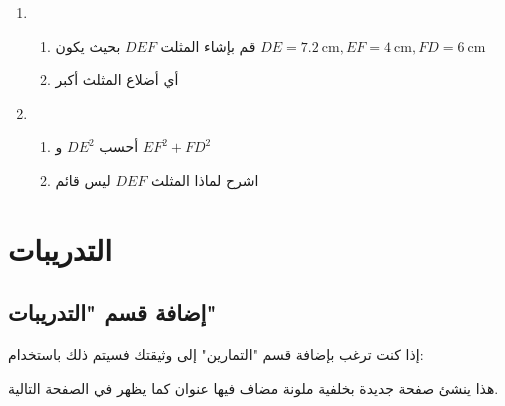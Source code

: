 \documentclass[12pt,a4paper]{mathbook_arabic}
\begin{document}


\begin{enumerate}
\item
\begin{enumerate}
\item  قم بإشاء المثلت $DEF$ بحيث يكون
$DE=7.2\ \text{cm},EF=4\ \text{cm},FD=6\ \text{cm}$
\item   أي أضلاع المثلث أكبر
\end{enumerate}
\item
\begin{enumerate}
\item   أحسب $DE^2$ 
و
$EF^2+FD^2$ 
\item   اشرح لماذا المثلث $DEF$ ليس قائم
\end{enumerate}
\end{enumerate}


\section{التدريبات}
\subsection{إضافة قسم "التدريبات"}
إذا كنت ترغب بإضافة قسم "التمارين" إلى وثيقتك فسيتم ذلك باستخدام:

\LR{\begin{lstlisting}
\exostart[1] %option [1] when put the Answers
\end{lstlisting}}


هذا ينشئ صفحة جديدة بخلفية ملونة مضاف فيها عنوان كما يظهر في الصفحة التالية.
\end{document}
